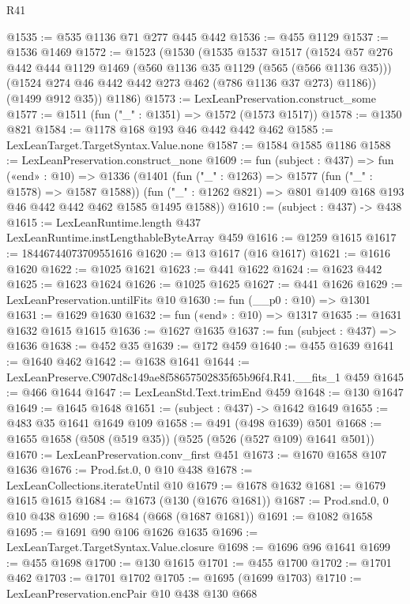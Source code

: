 \begin{lexlean}{R41}
\begin{coremodule}
@1535 := @535 @1136 @71 @277 @445 @442
@1536 := @455 @1129
@1537 := @1536 @1469
@1572 := @1523
    (@1530
      (@1535
        @1537
        @1517
        (@1524
          @57
          @276
          @442
          @444
          @1129
          @1469
          (@560 @1136 @35 @1129 (@565 (@566 @1136 @35)))
          (@1524 @274 @46 @442 @442 @273 @462 (@786 @1136 @37 @273) @1186))
        (@1499 @912 @35))
      @1186)
@1573 := LexLeanPreservation.construct_some
@1577 := @1511 (fun ("_" : @1351) => @1572 (@1573 @1517))
@1578 := @1350 @821
@1584 := @1178 @168 @193 @46 @442 @442 @462
@1585 := LexLeanTarget.TargetSyntax.Value.none
@1587 := @1584 @1585 @1186
@1588 := LexLeanPreservation.construct_none
@1609 := fun (subject : @437) =>
  fun («end» : @10) =>
  @1336
    (@1401
      (fun ("_" : @1263) => @1577 (fun ("_" : @1578) => @1587 @1588))
      (fun ("_" : @1262 @821) => @801 @1409 @168 @193 @46 @442 @442 @462 @1585 @1495 @1588))
@1610 := (subject : @437) -> @438
@1615 := LexLeanRuntime.length @437 LexLeanRuntime.instLengthableByteArray @459
@1616 := @1259 @1615
@1617 := 18446744073709551616
@1620 := @13 @1617 (@16 @1617)
@1621 := @1616 @1620
@1622 := @1025 @1621
@1623 := @441 @1622
@1624 := @1623 @442
@1625 := @1623 @1624
@1626 := @1025 @1625
@1627 := @441 @1626
@1629 := LexLeanPreservation.untilFits @10
@1630 := fun (__p0 : @10) => @1301
@1631 := @1629 @1630
@1632 := fun («end» : @10) => @1317
@1635 := @1631 @1632 @1615 @1615
@1636 := @1627 @1635
@1637 := fun (subject : @437) => @1636
@1638 := @452 @35
@1639 := @172 @459
@1640 := @455 @1639
@1641 := @1640 @462
@1642 := @1638 @1641
@1644 := LexLeanPreserve.C907d8c149ae8f58657502835f65b96f4.R41.__fits_1 @459
@1645 := @466 @1644
@1647 := LexLeanStd.Text.trimEnd @459
@1648 := @130 @1647
@1649 := @1645 @1648
@1651 := (subject : @437) -> @1642 @1649
@1655 := @483 @35 @1641 @1649 @109
@1658 := @491 (@498 @1639) @501
@1668 := @1655 @1658 (@508 (@519 @35)) (@525 (@526 (@527 @109) @1641 @501))
@1670 := LexLeanPreservation.conv_first @451
@1673 := @1670 @1658 @107 @1636
@1676 := Prod.fst.{0, 0} @10 @438
@1678 := LexLeanCollections.iterateUntil @10
@1679 := @1678 @1632
@1681 := @1679 @1615 @1615
@1684 := @1673 (@130 (@1676 @1681))
@1687 := Prod.snd.{0, 0} @10 @438
@1690 := @1684 (@668 (@1687 @1681))
@1691 := @1082 @1658
@1695 := @1691 @90 @106 @1626 @1635
@1696 := LexLeanTarget.TargetSyntax.Value.closure
@1698 := @1696 @96 @1641
@1699 := @455 @1698
@1700 := @130 @1615
@1701 := @455 @1700
@1702 := @1701 @462
@1703 := @1701 @1702
@1705 := @1695 (@1699 @1703)
@1710 := LexLeanPreservation.encPair @10 @438 @130 @668

\end{coremodule}
\end{lexlean}
